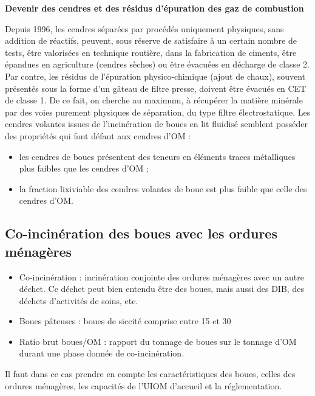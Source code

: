\vspace{0.3cm}
\textbf{Devenir des cendres et des résidus d’épuration des gaz de combustion}
\vspace{0.3cm}

Depuis 1996, les cendres séparées par procédés uniquement physiques, sans addition de réactifs, peuvent, sous réserve de satisfaire à un certain nombre de tests, être valorisées en technique routière, dans la fabrication de ciments, être épandues en agriculture (cendres sèches) ou être évacuées en décharge de classe 2.
Par contre, les résidus de l’épuration physico-chimique (ajout de chaux), souvent présentés sous la forme d’un gâteau de filtre presse, doivent être évacués en CET de classe 1.
De ce fait, on cherche au maximum, à récupérer la matière minérale par des voies purement physiques de séparation, du type filtre électrostatique.
Les cendres volantes issues de l’incinération de boues en lit fluidisé semblent posséder des propriétés qui font défaut aux cendres d’OM : 

\begin{itemize}
\item les cendres de boues présentent des teneurs en éléments traces métalliques plus faibles que les cendres d’OM ;
\item  la fraction lixiviable des cendres volantes de boue est plus faible que celle des cendres d’OM.
\end{itemize}


\subsection{Co-incinération des boues avec les ordures ménagères}

\begin{itemize}
    \item  Co-incinération : incinération conjointe des ordures ménagères avec un autre déchet. Ce déchet peut bien entendu être des boues, mais aussi des DIB, des déchets d’activités de soins, etc.
    \item  Boues pâteuses : boues de siccité comprise entre 15 et 30 %
    \item  Ratio brut boues/OM : rapport du tonnage de boues sur le tonnage d’OM durant une phase donnée de co-incinération.
\end{itemize}

Il faut dans ce cas prendre en compte les caractéristiques des boues, celles des ordures ménagères, les capacités de l’UIOM d’accueil et la réglementation.

